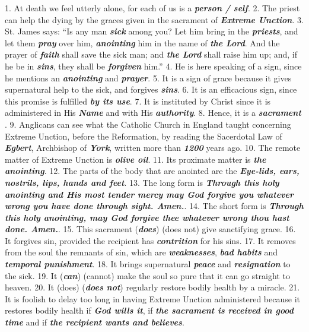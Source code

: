 \documentclass[a4paper,14pt]{memoir}
\newcommand\answer[1]{\textbf{\textit{#1}}}
\begin{document}
1. At death we feel utterly alone, for each of us  is  a  \answer{person / self}.  
2.  The
priest can help the dying by the graces given in the sacrament of  \answer{Extreme Unction}.
3. St. James says: “Is any man \answer{sick} among you?  Let  him  bring  in  the
\answer{priests}, and let them \answer{pray} over  him,  \answer{anointing}  him  in  the  name  of
\answer{the Lord}. And the prayer of \answer{faith} shall save the sick man;  and  \answer{the Lord}
shall raise him up; and, if he be in \answer{sins}, they shall be \answer{forgiven}  him.”
4. He is here speaking  of  a  sign,  since  he  mentions  an  \answer{anointing}  and
\answer{prayer}. 
5. It is a sign of grace because it  gives  supernatural  help  to
the sick, and forgives \answer{sins}. 
6. It is an efficacious  sign,  since  this
promise is fulfilled \answer{by its use}. 
7. It is instituted by  Christ  since  it  is
administered in His \answer{Name} and with  His  \answer{authority}.  
8.  Hence,  it  is  a
\answer{sacrament} . 
9. Anglicans can see what the Catholic Church in  England  taught
concerning  Extreme  Unction,  before  the  Reformation,  by   reading   the
Sacerdotal Law of  \answer{Egbert},  Archbishop  of  \answer{York},  written  more  than
\answer{1200} years ago. 
10. The remote matter of Extreme  Unction  is  \answer{olive oil}.
11. Its proximate matter is \answer{the anointing}. 
12. The parts of  the  body  that  are
anointed are the \answer{Eye-lids, ears, nostrils,  lips,  hands  and  feet}. 
13. The long form  is  \answer{Through this  holy  anointing  and
His most tender mercy may God forgive  you  whatever  wrong  you  have  done
through sight. Amen.}.  
14.  The  short
form is \answer{Through this  holy
anointing, may God forgive thee whatever wrong thou hast done. Amen.}. 
15. This sacrament  (\answer{does})  (does  not)  give  sanctifying
grace. 
16. It forgives sin, provided the  recipient  has  \answer{contrition}  for  his
sins. 
17. It removes from the soul the remnants of sin, which are  \answer{weaknesses},
\answer{bad habits} and \answer{temporal punishment}. 
18. It brings supernatural \answer{peace} and  \answer{resignation}  to
the sick. 
19. It (\answer{can}) (cannot) make  the  soul  so  pure  that  it  can  go
straight to heaven. 
20.  It  (does)  (\answer{does  not})  regularly  restore  bodily
health by a miracle. 
21. It is foolish to delay too long in  having  Extreme
Unction administered because it  restores  bodily  health  if  \answer{God wills it},  if
\answer{the sacrament is received in good time} and if \answer{the recipient wants and believes}. 
\end{document}
